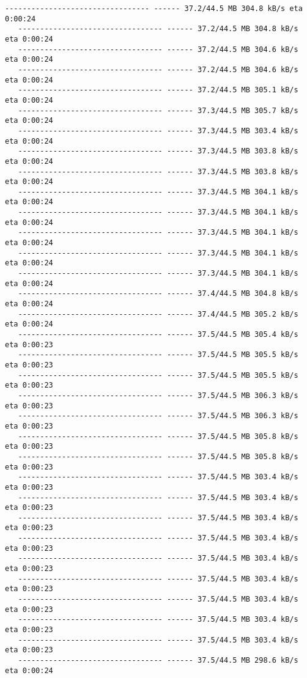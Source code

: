 \documentclass[11pt]{article}
\begin{document}
\begin{Verbatim}[commandchars=\\\{\}]
   --------------------------------- ------ 37.2/44.5 MB 304.8 kB/s eta 0:00:24
   --------------------------------- ------ 37.2/44.5 MB 304.8 kB/s eta 0:00:24
   --------------------------------- ------ 37.2/44.5 MB 304.6 kB/s eta 0:00:24
   --------------------------------- ------ 37.2/44.5 MB 304.6 kB/s eta 0:00:24
   --------------------------------- ------ 37.2/44.5 MB 305.1 kB/s eta 0:00:24
   --------------------------------- ------ 37.3/44.5 MB 305.7 kB/s eta 0:00:24
   --------------------------------- ------ 37.3/44.5 MB 303.4 kB/s eta 0:00:24
   --------------------------------- ------ 37.3/44.5 MB 303.8 kB/s eta 0:00:24
   --------------------------------- ------ 37.3/44.5 MB 303.8 kB/s eta 0:00:24
   --------------------------------- ------ 37.3/44.5 MB 304.1 kB/s eta 0:00:24
   --------------------------------- ------ 37.3/44.5 MB 304.1 kB/s eta 0:00:24
   --------------------------------- ------ 37.3/44.5 MB 304.1 kB/s eta 0:00:24
   --------------------------------- ------ 37.3/44.5 MB 304.1 kB/s eta 0:00:24
   --------------------------------- ------ 37.3/44.5 MB 304.1 kB/s eta 0:00:24
   --------------------------------- ------ 37.4/44.5 MB 304.8 kB/s eta 0:00:24
   --------------------------------- ------ 37.4/44.5 MB 305.2 kB/s eta 0:00:24
   --------------------------------- ------ 37.5/44.5 MB 305.4 kB/s eta 0:00:23
   --------------------------------- ------ 37.5/44.5 MB 305.5 kB/s eta 0:00:23
   --------------------------------- ------ 37.5/44.5 MB 305.5 kB/s eta 0:00:23
   --------------------------------- ------ 37.5/44.5 MB 306.3 kB/s eta 0:00:23
   --------------------------------- ------ 37.5/44.5 MB 306.3 kB/s eta 0:00:23
   --------------------------------- ------ 37.5/44.5 MB 305.8 kB/s eta 0:00:23
   --------------------------------- ------ 37.5/44.5 MB 305.8 kB/s eta 0:00:23
   --------------------------------- ------ 37.5/44.5 MB 303.4 kB/s eta 0:00:23
   --------------------------------- ------ 37.5/44.5 MB 303.4 kB/s eta 0:00:23
   --------------------------------- ------ 37.5/44.5 MB 303.4 kB/s eta 0:00:23
   --------------------------------- ------ 37.5/44.5 MB 303.4 kB/s eta 0:00:23
   --------------------------------- ------ 37.5/44.5 MB 303.4 kB/s eta 0:00:23
   --------------------------------- ------ 37.5/44.5 MB 303.4 kB/s eta 0:00:23
   --------------------------------- ------ 37.5/44.5 MB 303.4 kB/s eta 0:00:23
   --------------------------------- ------ 37.5/44.5 MB 303.4 kB/s eta 0:00:23
   --------------------------------- ------ 37.5/44.5 MB 303.4 kB/s eta 0:00:23
   --------------------------------- ------ 37.5/44.5 MB 298.6 kB/s eta 0:00:24

\end{Verbatim}
\end{document}
